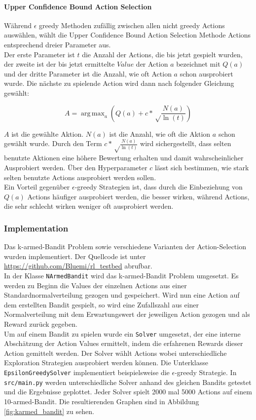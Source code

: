 \documentclass[11pt]{scrartcl}
\DeclareMathOperator*{\argmax}{arg\,max}
\begin{document}
\paragraph{Upper Confidence Bound Action Selection}
Während $\epsilon$ greedy Methoden zufällig zwischen allen nicht greedy Actions
auswählen, wählt die Upper Confidence Bound Ac\-tion Selection Methode Actions entsprechend
dreier Parameter aus.\\
Der erste Parameter ist $t$ die Anzahl der Actions, die bis jetzt gespielt wurden, der
zweite ist der bis jetzt ermittelte $Value$ der Action $a$ bezeichnet mit $Q(a)$ und der
dritte Parameter ist die Anzahl, wie oft Action $a$ schon ausprobiert wurde. Die nächste
zu spielende Action wird dann nach folgender Gleichung gewählt:

\[ A = \argmax_a\left( Q(a) + c*\sqrt\frac{N(a)}{\ln(t)} \right) \]

\noindent
$A$ ist die gewählte Aktion. $N(a)$ ist die Anzahl, wie oft die Aktion $a$ schon gewählt
wurde. Durch den Term $c*\sqrt\frac{N(a)}{\ln(t)}$ wird sichergestellt, dass selten
benutzte Aktionen eine höhere Bewertung erhalten und damit wahrscheinlicher Ausprobiert
werden. Über den Hyperparameter $c$ lässt sich bestimmen, wie stark selten benutzte
Actions ausprobiert werden sollen.\\
Ein Vorteil gegenüber $\epsilon$-greedy Strategien ist, dass durch die Einbeziehung von
$Q(a)$ Actions häufiger ausprobiert werden, die besser wirken, während Actions, die sehr
schlecht wirken weniger oft ausprobiert werden.

\subsubsection{Implementation}
Das k-armed-Bandit Problem sowie verschiedene Varianten der Action-Selection wurden
implementiert. Der Quellcode ist unter \url{https://github.com/Bluemi/rl_testbed}
abrufbar.\\
In der Klasse \lstinline!NArmedBandit! wird das k-armed-Bandit Problem umgesetzt. Es
werden zu Beginn die Values der einzelnen Actions aus einer Standardnormalverteilung
gezogen und gespeichert. Wird nun eine Action auf dem erstellten Bandit gespielt, so wird
eine Zufallszahl aus einer Normalverteilung mit dem Erwartungswert der jeweiligen Action
gezogen und als Reward zurück gegeben.\\
Um auf einem Bandit zu spielen wurde ein \lstinline!Solver! umgesetzt, der eine interne
Abschätzung der Action Values ermittelt, indem die erfahrenen Rewards dieser Action
gemittelt werden. Der Solver wählt Actions wobei unterschiedliche Exploration Strategien
ausprobiert werden können. Die Unterklasse \lstinline!EpsilonGreedySolver! implementiert
beispielsweise die $\epsilon$-greedy Strategie.
In \lstinline!src/main.py! werden unterschiedliche Solver anhand des gleichen Bandits
getestet und die Ergebnisse geplottet. Jeder Solver spielt 2000 mal 5000 Actions auf
einem 10-armed-Bandit. Die resultierenden Graphen sind in Abbildung
\ref{fig:karmed_bandit} zu sehen.
\end{document}
